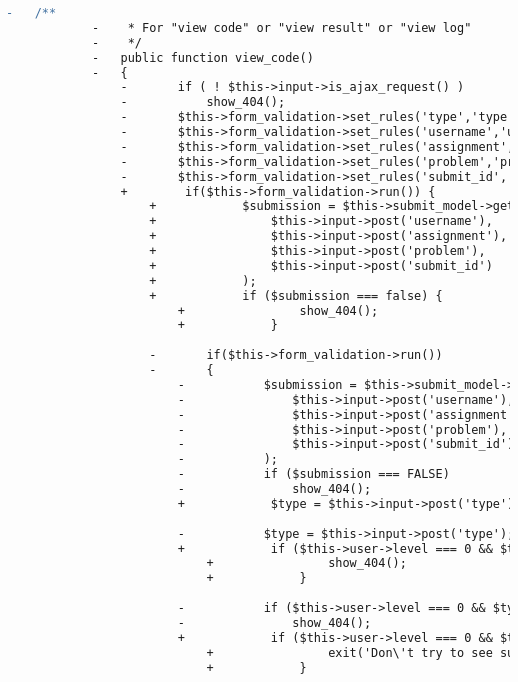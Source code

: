 \begin{lstlisting}[language=diff, caption=Perubahan pada kode Submissions.php]
			-	/**
			-	 * For "view code" or "view result" or "view log"
			-	 */
			-	public function view_code()
			-	{
				-		if ( ! $this->input->is_ajax_request() )
				-			show_404();
				-		$this->form_validation->set_rules('type','type','callback__check_type');
				-		$this->form_validation->set_rules('username','username','required|min_length[3]|max_length[20]|alpha_numeric');
				-		$this->form_validation->set_rules('assignment','assignment','integer|greater_than[0]');
				-		$this->form_validation->set_rules('problem','problem','integer|greater_than[0]');
				-		$this->form_validation->set_rules('submit_id','submit_id','integer|greater_than[0]');
				+        if($this->form_validation->run()) {
					+            $submission = $this->submit_model->get_submission(
					+                $this->input->post('username'),
					+                $this->input->post('assignment'),
					+                $this->input->post('problem'),
					+                $this->input->post('submit_id')
					+            );
					+            if ($submission === false) {
						+                show_404();
						+            }
					
					-		if($this->form_validation->run())
					-		{
						-			$submission = $this->submit_model->get_submission(
						-				$this->input->post('username'),
						-				$this->input->post('assignment'),
						-				$this->input->post('problem'),
						-				$this->input->post('submit_id')
						-			);
						-			if ($submission === FALSE)
						-				show_404();
						+            $type = $this->input->post('type'); // $type is 'code', 'result', or 'log'
						
						-			$type = $this->input->post('type'); // $type is 'code', 'result', or 'log'
						+            if ($this->user->level === 0 && $type === 'log') {
							+                show_404();
							+            }
						
						-			if ($this->user->level === 0 && $type === 'log')
						-				show_404();
						+            if ($this->user->level === 0 && $this->user->username != $submission['username']) {
							+                exit('Don\'t try to see submitted codes :)');
							+            }
						

\end{lstlisting}
